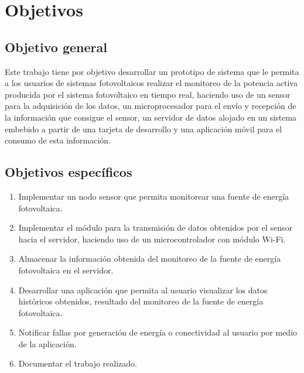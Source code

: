 
\section{Objetivos}

\subsection{Objetivo general}
Este trabajo tiene por objetivo desarrollar un prototipo de sistema que le permita a los usuarios de sistemas fotovoltaicos realizar el monitoreo de la potencia activa producida por el sistema fotovoltaico en tiempo real, haciendo uso de un sensor para la adquisición de los datos, un microprocesador para el envío y recepción de la información que consigue el sensor, un servidor de datos alojado en un sistema embebido a partir de una tarjeta de desarrollo y una aplicación móvil para el consumo de esta información.

\subsection{Objetivos específicos}
\begin{enumerate}[label=\arabic*.]
    \item Implementar un nodo sensor que permita monitorear una fuente de energía fotovoltaica.
    \item Implementar el módulo para la transmisión de datos obtenidos por el sensor hacia el servidor, haciendo uso de un microcontrolador con módulo Wi-Fi. 
    \item Almacenar la información obtenida del monitoreo de la fuente de energía fotovoltaica en el servidor.
    \item Desarrollar una aplicación que permita al usuario visualizar los datos históricos obtenidos, resultado del monitoreo de la fuente de energía fotovoltaica.
    \item Notificar fallas por generación de energía o conectividad al usuario por medio de la aplicación.
    \item Documentar el trabajo realizado.
\end{enumerate}
